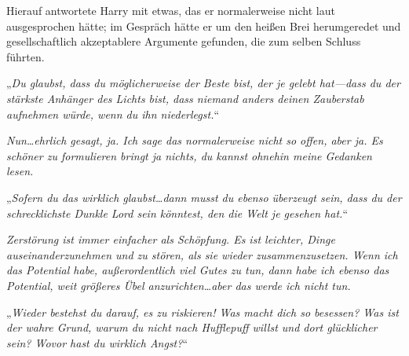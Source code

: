 Hierauf antwortete Harry mit etwas, das er normalerweise nicht laut ausgesprochen hätte; im Gespräch hätte er um den heißen Brei herumgeredet und gesellschaftlich akzeptablere Argumente gefunden, die zum selben Schluss führten.

„\emph{Du glaubst, dass du möglicherweise der Beste bist, der je gelebt hat—dass du der stärkste Anhänger des Lichts bist, dass niemand anders deinen Zauberstab aufnehmen würde, wenn du ihn niederlegst.}“

\emph{Nun…ehrlich gesagt, ja. Ich sage das normalerweise nicht so offen, aber ja. Es schöner zu formulieren bringt ja nichts, du kannst ohnehin meine Gedanken lesen. }

„\emph{Sofern du das wirklich glaubst…dann musst du ebenso überzeugt sein, dass du der schrecklichste Dunkle Lord sein könntest, den die Welt je gesehen hat.}“

\emph{Zerstörung ist immer einfacher als Schöpfung. Es ist leichter, Dinge auseinanderzunehmen und zu stören, als sie wieder zusammenzusetzen. Wenn ich das Potential habe, außerordentlich viel Gutes zu tun, dann habe ich ebenso das Potential, weit größeres Übel anzurichten…aber das werde ich nicht tun. }

„\emph{Wieder bestehst du darauf, es zu riskieren! Was macht dich so besessen? Was ist der wahre Grund, warum du nicht nach Hufflepuff willst und dort \emph{glücklicher} sein? Wovor hast du wirklich Angst?}“

